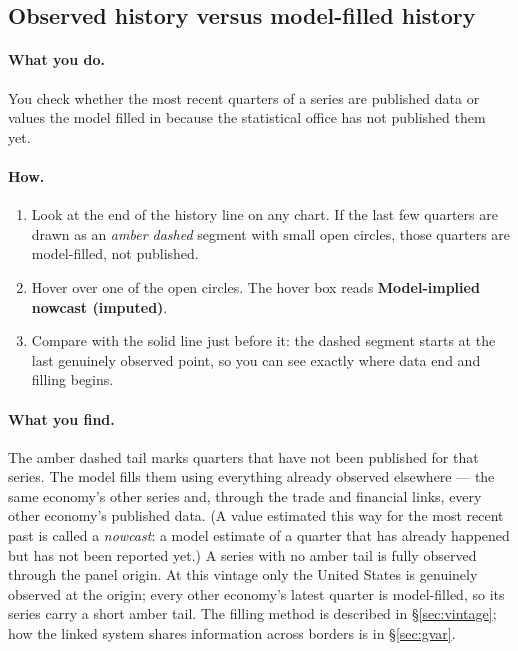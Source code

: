 \documentclass[11pt]{article}
\theoremstyle{definition}
\theoremstyle{remark}
\begin{document}
\subsection{Observed history versus model-filled history}

\paragraph{What you do.}
You check whether the most recent quarters of a series are published data or values
the model filled in because the statistical office has not published them yet.

\paragraph{How.}
\begin{enumerate}
  \item Look at the end of the history line on any chart. If the last few quarters
    are drawn as an \emph{amber dashed} segment with small open circles, those
    quarters are model-filled, not published.
  \item Hover over one of the open circles. The hover box reads
    \textbf{Model-implied nowcast (imputed)}.
  \item Compare with the solid line just before it: the dashed segment starts at
    the last genuinely observed point, so you can see exactly where data end and
    filling begins.
\end{enumerate}

\paragraph{What you find.}
The amber dashed tail marks quarters that have not been published for that series.
The model fills them using everything already observed elsewhere --- the same
economy's other series and, through the trade and financial links, every other
economy's published data. (A value estimated this way for the most recent past is
called a \emph{nowcast}: a model estimate of a quarter that has already happened
but has not been reported yet.) A series with no amber tail is fully observed
through the panel origin. At this vintage only the United States is genuinely
observed at the origin; every other economy's latest quarter is model-filled, so
its series carry a short amber tail. The filling method is described in
\S\ref{sec:vintage}; how the linked system shares information across borders is in
\S\ref{sec:gvar}.
\end{document}

